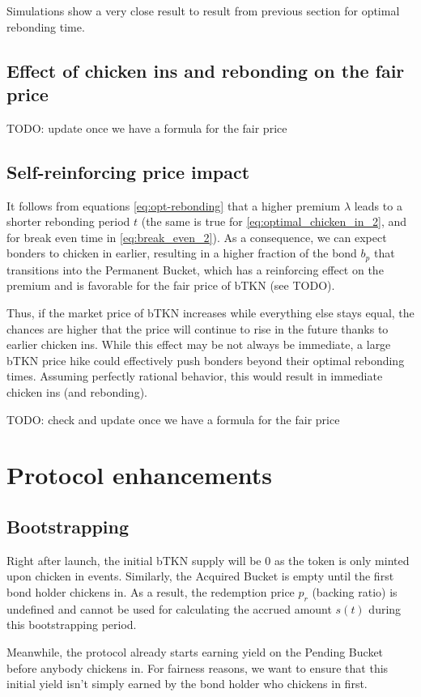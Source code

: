 \documentclass{article}
\begin{document}
Simulations show a very close result to result from previous section for optimal rebonding time.

\subsection{Effect of chicken ins and rebonding on the fair price}
TODO: update once we have a formula for the fair price

\subsection{Self-reinforcing price impact}
It follows from equations \ref{eq:opt-rebonding} that a higher premium $\lambda$ leads to a shorter rebonding period $t$ (the same is true for \ref{eq:optimal_chicken_in_2}, and for break even time in \ref{eq:break_even_2}). As a consequence, we can expect bonders to chicken in earlier, resulting in a higher fraction of the bond $b_p$ that transitions into the Permanent Bucket, which has a reinforcing effect on the premium and is favorable for the fair price of bTKN (see TODO).

Thus, if the market price of bTKN increases while everything else stays equal, the chances are higher that the price will continue to rise in the future thanks to earlier chicken ins. While this effect may be not always be immediate, a large bTKN price hike could effectively push bonders beyond their optimal rebonding times.
Assuming perfectly rational behavior, this would result in immediate chicken ins (and rebonding).

TODO: check and update once we have a formula for the fair price

\section{Protocol enhancements}
\subsection{Bootstrapping}
  \label{sec:bootstrapping}
Right after launch, the initial bTKN supply will be 0 as the token is only minted upon chicken in events. Similarly, the Acquired Bucket is empty until the first bond holder chickens in. As a result, the redemption price $p_r$ (backing ratio) is undefined and cannot be used for calculating the accrued amount $s(t)$ during this bootstrapping period.

Meanwhile, the protocol already starts earning yield on the Pending Bucket before anybody chickens in. For fairness reasons, we want to ensure that this initial yield isn't simply earned by the bond holder who chickens in first.
\end{document}
